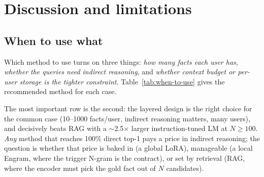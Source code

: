 \documentclass[11pt]{article}
\begin{document}
\section{Discussion and limitations}
\label{sec:discussion}

\subsection{When to use what}
\label{sec:when-to-use}

Which method to use turns on three things: \emph{how many facts
each user has}, \emph{whether the queries need indirect
reasoning}, and \emph{whether context budget or per-user storage
is the tighter constraint}. Table~\ref{tab:when-to-use} gives the
recommended method for each case.

\begin{table}[ht]
  \centering
  \caption{Cheat sheet for which method to use.
  ``invariant'' = the number does not
  degrade with KB / population size.}
  \label{tab:when-to-use}
\end{table}

The most important row is the second: the layered design is the right
choice for the common case (10--1000 facts/user, indirect
reasoning matters, many users), and decisively beats RAG with a
$\sim$2.5$\times$ larger instruction-tuned LM at $N \geq 100$.
\emph{Any} method that reaches 100\% direct top-1 pays a price in
indirect reasoning; the question is whether that price is baked
in (a global LoRA), manageable (a local Engram, where the trigger
N-gram is the contract), or set by retrieval (RAG, where the
encoder must pick the gold fact out of $N$ candidates).
\end{document}
